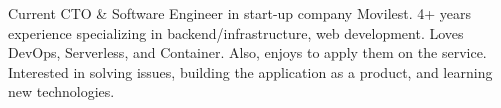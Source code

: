 

\begin{cvparagraph}

Current CTO \& Software Engineer in start-up company Movilest.
4+ years experience specializing in backend/infrastructure, web development.
Loves DevOps, Serverless, and Container. Also, enjoys to apply them on the service.
Interested in solving issues, building the application as a product, and learning new technologies.
\end{cvparagraph}
